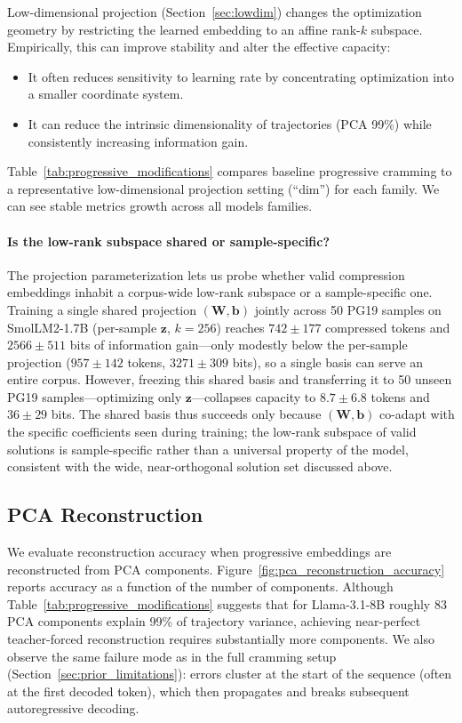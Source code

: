 \documentclass{article}
\theoremstyle{plain}
\theoremstyle{definition}
\theoremstyle{remark}
\begin{document}
Low-dimensional projection (Section~\ref{sec:lowdim}) changes the optimization geometry by restricting the learned embedding to an affine rank-$k$ subspace.
Empirically, this can improve stability and alter the effective capacity:
\begin{itemize}
    \item It often reduces sensitivity to learning rate by concentrating optimization into a smaller coordinate system.
    \item It can reduce the intrinsic dimensionality of trajectories (PCA 99\%) while consistently increasing information gain.
\end{itemize}

Table~\ref{tab:progressive_modifications} compares baseline progressive cramming to a representative low-dimensional projection setting (``dim'') for each family. We can see stable metrics growth across all models families.

\paragraph{Is the low-rank subspace shared or sample-specific?}
The projection parameterization lets us probe whether valid compression embeddings inhabit a corpus-wide low-rank subspace or a sample-specific one.
Training a single shared projection $(\mathbf{W}, \mathbf{b})$ jointly across 50 PG19 samples on SmolLM2-1.7B (per-sample $\mathbf{z}$, $k=256$) reaches $742 \pm 177$ compressed tokens and $2566 \pm 511$ bits of information gain---only modestly below the per-sample projection ($957 \pm 142$ tokens, $3271 \pm 309$ bits), so a single basis can serve an entire corpus.
However, freezing this shared basis and transferring it to 50 unseen PG19 samples---optimizing only $\mathbf{z}$---collapses capacity to $8.7 \pm 6.8$ tokens and $36 \pm 29$ bits.
The shared basis thus succeeds only because $(\mathbf{W}, \mathbf{b})$ co-adapt with the specific coefficients seen during training; the low-rank subspace of valid solutions is sample-specific rather than a universal property of the model, consistent with the wide, near-orthogonal solution set discussed above.


\subsection{PCA Reconstruction}
\label{sec:pca_reconstruction}

We evaluate reconstruction accuracy when progressive embeddings are reconstructed from PCA components.
Figure~\ref{fig:pca_reconstruction_accuracy} reports accuracy as a function of the number of components.
Although Table~\ref{tab:progressive_modifications} suggests that for Llama-3.1-8B roughly 83 PCA components explain 99\% of trajectory variance, achieving near-perfect teacher-forced reconstruction requires substantially more components.
We also observe the same failure mode as in the full cramming setup (Section~\ref{sec:prior_limitations}):
errors cluster at the start of the sequence (often at the first decoded token), which then propagates and breaks subsequent autoregressive decoding.
\end{document}
